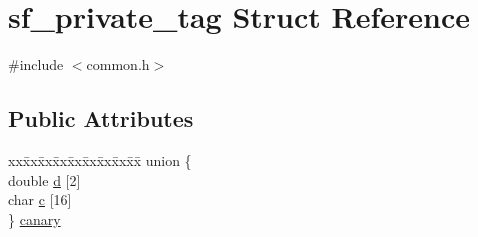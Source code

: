 \hypertarget{structsf__private__tag}{}\section{sf\+\_\+private\+\_\+tag Struct Reference}
\label{structsf__private__tag}


{\ttfamily \#include $<$common.\+h$>$}

\subsection*{Public Attributes}
\begin{DoxyCompactItemize}
\item 
\begin{tabbing}
xx\=xx\=xx\=xx\=xx\=xx\=xx\=xx\=xx\=\kill
union \{\\
\>double \hyperlink{structsf__private__tag_a2f6fb9f814910c55cf62166a1686512b}{d} \mbox{[}2\mbox{]}\\
\>char \hyperlink{structsf__private__tag_aca37b34c9215f8c4f934ead50bbd651c}{c} \mbox{[}16\mbox{]}\\
\} \hyperlink{structsf__private__tag_af73c81f24b867fd205d826e0cfaacf7c}{canary}\\


\end{tabbing}
\end{DoxyCompactItemize}
